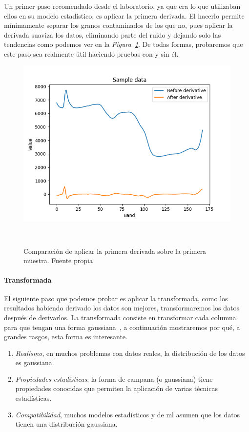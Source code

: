Un primer paso recomendado desde el laboratorio, ya que era lo que utilizaban ellos en su modelo estadístico, es aplicar la primera derivada. El hacerlo permite mínimamente separar los granos contaminados de los que no, pues aplicar la derivada suaviza los datos, eliminando parte del ruido y dejando solo las tendencias como podemos ver en la \textit{Figura\ \ref{fig:derivative}}.
De todas formas, probaremos que este paso sea realmente útil haciendo pruebas con y sin él.

\begin{figure}
    \centering
    \includegraphics[width=0.8\linewidth]{media/images/derivative.png}
    \caption{Comparación de aplicar la primera derivada sobre la primera muestra. Fuente propia}\ \label{fig:derivative}
\end{figure}

\paragraph{Transformada}

El siguiente paso que podemos probar es aplicar la transformada, como los resultados habiendo derivado los datos son mejores, transformaremos los datos después de derivarlos. La transformada consiste en transformar cada columna para que tengan una forma gaussiana\ \cite{sklearnp39:online}, a continuación mostraremos por qué, a grandes rasgos, esta forma es interesante. \cite{TheRoleo87:online}

\begin{enumerate}
    \item \textit{Realismo}, en muchos problemas con datos reales, la distribución de los datos es gaussiana.
    \item \textit{Propiedades estadísticas}, la forma de campana (o gaussiana) tiene propiedades conocidas que permiten la aplicación de varias técnicas estadísticas.
    \item \textit{Compatibilidad}, muchos modelos estadísticos y de \gls{ml} asumen que los datos tienen una distribución gaussiana.
\end{enumerate}


